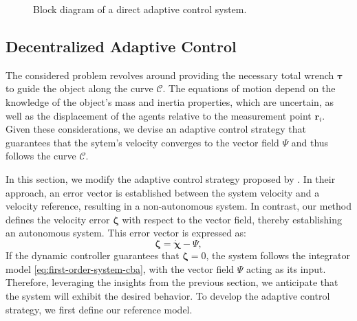 \begin{figure}[ht]
{\begin{tikzpicture}
    
    
    
    

    
    
    
    
    \end{tikzpicture}%
    }
    \caption{Block diagram of a direct adaptive control system.}
    \label{fig:collaborative-full-diagram}
\end{figure}
\subsection{Decentralized Adaptive Control}
The considered problem revolves around providing the necessary total wrench $\boldsymbol{\tau}$ to guide the object along the curve $\mathcal{C}$. The equations of motion depend on the knowledge of the object's mass and inertia properties, which are uncertain, as well as the displacement of the agents relative to the measurement point $\mathbf{r}_i$. Given these considerations, we devise an adaptive control strategy that guarantees that the sytem's velocity converges to the vector field $\Psi$ and thus follows the curve $\mathcal{C}$.

In this section, we modify the adaptive control strategy proposed by \cite{Culbertson2021}. In their approach, an error vector is established between the system velocity and a velocity reference, resulting in a non-autonomous system. In contrast, our method defines the velocity error $\boldsymbol{\zeta}$ with respect to the vector field, thereby establishing an autonomous system. This error vector is expressed as:
\begin{equation}
    \boldsymbol{\zeta} = \dot{\boldsymbol{\chi}} - \Psi,\label{eq:errorvector-s}
\end{equation}
If the dynamic controller guarantees that $\boldsymbol{\zeta}=0$, the system follows the integrator model \eqref{eq:first-order-system-cba}, with the vector field $\Psi$ acting as its input. Therefore, leveraging the insights from the previous section, we anticipate that the system will exhibit the desired behavior. To develop the adaptive control strategy, we first define our reference model.

